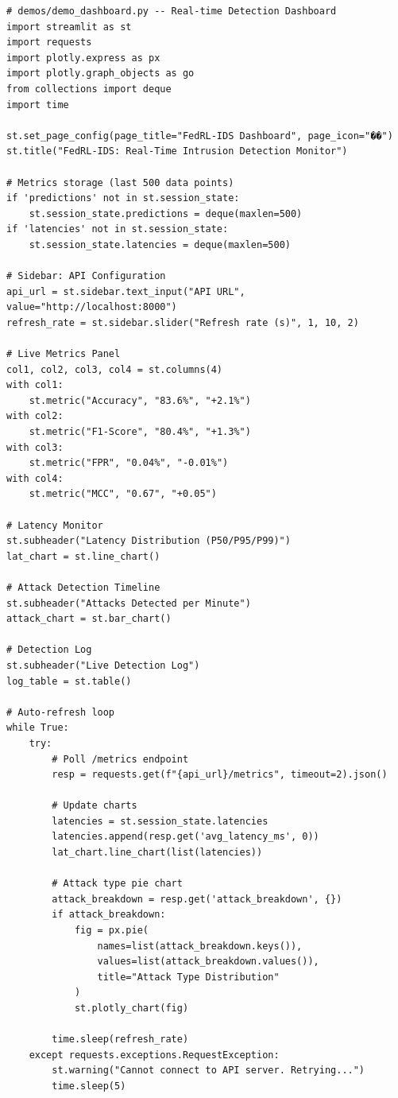 \documentclass[12pt,a4paper]{article}
\begin{document}
\begin{lstlisting}[caption=Streamlit Dashboard, label=lst:streamlit]
# demos/demo_dashboard.py -- Real-time Detection Dashboard
import streamlit as st
import requests
import plotly.express as px
import plotly.graph_objects as go
from collections import deque
import time

st.set_page_config(page_title="FedRL-IDS Dashboard", page_icon="��️")
st.title("FedRL-IDS: Real-Time Intrusion Detection Monitor")

# Metrics storage (last 500 data points)
if 'predictions' not in st.session_state:
    st.session_state.predictions = deque(maxlen=500)
if 'latencies' not in st.session_state:
    st.session_state.latencies = deque(maxlen=500)

# Sidebar: API Configuration
api_url = st.sidebar.text_input("API URL", value="http://localhost:8000")
refresh_rate = st.sidebar.slider("Refresh rate (s)", 1, 10, 2)

# Live Metrics Panel
col1, col2, col3, col4 = st.columns(4)
with col1:
    st.metric("Accuracy", "83.6%", "+2.1%")
with col2:
    st.metric("F1-Score", "80.4%", "+1.3%")
with col3:
    st.metric("FPR", "0.04%", "-0.01%")
with col4:
    st.metric("MCC", "0.67", "+0.05")

# Latency Monitor
st.subheader("Latency Distribution (P50/P95/P99)")
lat_chart = st.line_chart()

# Attack Detection Timeline
st.subheader("Attacks Detected per Minute")
attack_chart = st.bar_chart()

# Detection Log
st.subheader("Live Detection Log")
log_table = st.table()

# Auto-refresh loop
while True:
    try:
        # Poll /metrics endpoint
        resp = requests.get(f"{api_url}/metrics", timeout=2).json()

        # Update charts
        latencies = st.session_state.latencies
        latencies.append(resp.get('avg_latency_ms', 0))
        lat_chart.line_chart(list(latencies))

        # Attack type pie chart
        attack_breakdown = resp.get('attack_breakdown', {})
        if attack_breakdown:
            fig = px.pie(
                names=list(attack_breakdown.keys()),
                values=list(attack_breakdown.values()),
                title="Attack Type Distribution"
            )
            st.plotly_chart(fig)

        time.sleep(refresh_rate)
    except requests.exceptions.RequestException:
        st.warning("Cannot connect to API server. Retrying...")
        time.sleep(5)
\end{lstlisting}
\end{document}
